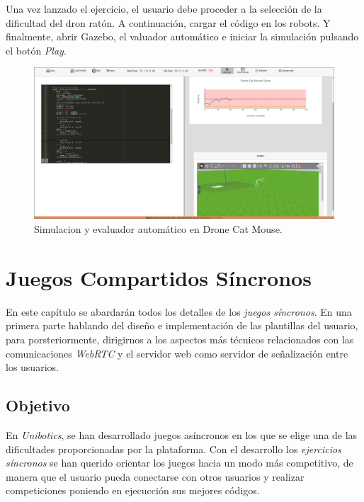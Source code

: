 \documentclass[a4paper, 12pt]{book}
\begin{document}
Una vez lanzado el ejercicio, el usuario debe proceder a la selección de la dificultad del dron ratón. A continuación, cargar el código en los robots. Y finalmente, abrir Gazebo, el valuador automático e iniciar la simulación pulsando el botón \emph{Play}.

\begin{figure}[H]
	\centering
    \includegraphics[width=12cm]{img/dcm_sim.png}
    \caption{Simulacion y evaluador automático en Drone Cat Mouse.}
\end{figure}


\cleardoublepage
\chapter{Juegos Compartidos Síncronos}

En este capítulo se abardarán todos los detalles de los \emph{juegos síncronos}. En una primera parte hablando del diseño e implementación de las plantillas del usuario, para porsteriormente, dirigirnos a los aspectos más técnicos relacionados con las comunicaciones \emph{WebRTC} y el servidor web como servidor de señalización entre los usuarios.

\section{Objetivo}
\label{sync_objective}

En \emph{Unibotics}, se han desarrollado juegos asíncronos en los que se elige una de las dificultades proporcionadas por la plataforma. Con el desarrollo los \emph{ejercicios síncronos} se han querido orientar los juegos hacia un modo más competitivo, de manera que el usuario pueda conectarse con otros usuarios y realizar competiciones poniendo en ejecucción sus mejores códigos.
\end{document}
